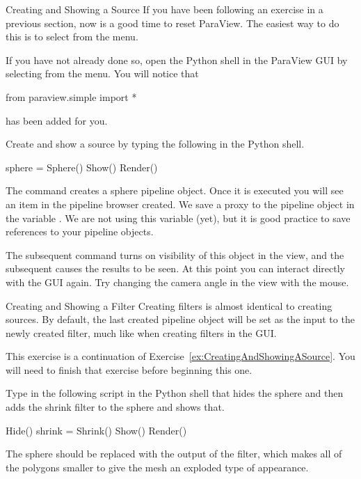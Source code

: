 \begin{exercise}{Creating and Showing a Source}
  \label{ex:CreatingAndShowingASource}%
  If you have been following an exercise in a previous section, now is a
  good time to reset ParaView.  The easiest way to do this is to select
   \ra {} from the menu.

  If you have not already done so, open the Python shell in the ParaView
  GUI by selecting  \ra {} from the menu.  You
  will notice that
  \begin{python}
from paraview.simple import *
  \end{python}
  has been added for you.

  Create and show a  source by typing the following in the
  Python shell.
  \begin{python}
sphere = Sphere()
Show()
Render()
  \end{python}

  The  command creates a sphere pipeline object.  Once it is
  executed you will see an item in the pipeline browser created.  We save a
  proxy to the pipeline object in the variable
  .  We are not using this variable (yet), but it is good
  practice to save references to your pipeline objects.

  The subsequent  command turns on visibility of this object in
  the view, and the subsequent  causes the results to be
  seen.  At this point you can interact directly with the GUI again.  Try
  changing the camera angle in the view with the mouse.
\end{exercise}

\begin{exercise}{Creating and Showing a Filter}
  \label{ex:CreatingAndShowingAFilter}%
  Creating filters is almost identical to creating sources.  By default,
  the last created pipeline object will be set as the input to the newly
  created filter, much like when creating filters in the GUI.

  This exercise is a continuation of
  Exercise~\ref{ex:CreatingAndShowingASource}.  You will need to finish
  that exercise before beginning this one.

  Type in the following script in the Python shell that hides the sphere
  and then adds the shrink filter to the sphere and shows that.

  \begin{python}
Hide()
shrink = Shrink()
Show()
Render()
  \end{python}

  The sphere should be replaced with the output of the 
  filter, which makes all of the polygons smaller to give the mesh an
  exploded type of appearance.
\end{exercise}

